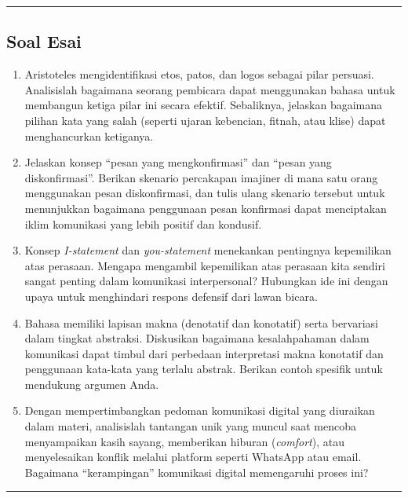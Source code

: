 \documentclass[
  letterpaper,
  DIV=11,
  numbers=noendperiod]{scrreprt}
\begin{document}
\begin{center}\rule{0.5\linewidth}{0.5pt}\end{center}

\subsection{Soal Esai}\label{soal-esai}

\begin{enumerate}
\def\labelenumi{\arabic{enumi}.}
\item
  Aristoteles mengidentifikasi etos, patos, dan logos sebagai pilar
  persuasi. Analisislah bagaimana seorang pembicara dapat menggunakan
  bahasa untuk membangun ketiga pilar ini secara efektif. Sebaliknya,
  jelaskan bagaimana pilihan kata yang salah (seperti ujaran kebencian,
  fitnah, atau klise) dapat menghancurkan ketiganya.
\item
  Jelaskan konsep ``pesan yang mengkonfirmasi'' dan ``pesan yang
  diskonfirmasi''. Berikan skenario percakapan imajiner di mana satu
  orang menggunakan pesan diskonfirmasi, dan tulis ulang skenario
  tersebut untuk menunjukkan bagaimana penggunaan pesan konfirmasi dapat
  menciptakan iklim komunikasi yang lebih positif dan kondusif.
\item
  Konsep \emph{I-statement} dan \emph{you-statement} menekankan
  pentingnya kepemilikan atas perasaan. Mengapa mengambil kepemilikan
  atas perasaan kita sendiri sangat penting dalam komunikasi
  interpersonal? Hubungkan ide ini dengan upaya untuk menghindari
  respons defensif dari lawan bicara.
\item
  Bahasa memiliki lapisan makna (denotatif dan konotatif) serta
  bervariasi dalam tingkat abstraksi. Diskusikan bagaimana
  kesalahpahaman dalam komunikasi dapat timbul dari perbedaan
  interpretasi makna konotatif dan penggunaan kata-kata yang terlalu
  abstrak. Berikan contoh spesifik untuk mendukung argumen Anda.
\item
  Dengan mempertimbangkan pedoman komunikasi digital yang diuraikan
  dalam materi, analisislah tantangan unik yang muncul saat mencoba
  menyampaikan kasih sayang, memberikan hiburan (\emph{comfort}), atau
  menyelesaikan konflik melalui platform seperti WhatsApp atau email.
  Bagaimana ``kerampingan'' komunikasi digital memengaruhi proses ini?
\end{enumerate}

\begin{center}\rule{0.5\linewidth}{0.5pt}\end{center}
\end{document}
